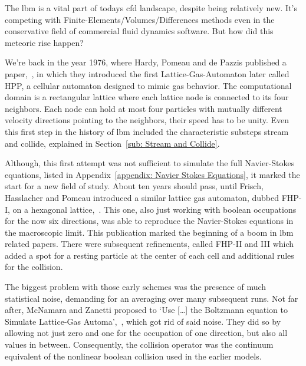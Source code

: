 
The \gls{lbm} is a vital part of todays \gls{cfd} landscape, despite being relatively new.
It's competing with Finite-Elements/Volumes/Differences methods even in the conservative field of commercial fluid dynamics software.
But how did this meteoric rise happen?

We're back in the year 1976, where Hardy, Pomeau and de Pazzis published a paper,~\cite{hardy1976molecular}, in which they introduced the first Lattice-Gas-Automaton later called HPP, a cellular automaton designed to mimic gas behavior.
The computational domain is a rectangular lattice where each lattice node is connected to its four neighbors.
Each node can hold at most four particles with mutually different velocity directions pointing to the neighbors, their speed has to be unity.
Even this first step in the history of \gls{lbm} included the characteristic substeps stream and collide, explained in Section~\ref{sub: Stream and Collide}.

Although, this first attempt was not sufficient to simulate the full Navier-Stokes equations, listed in Appendix~\ref{appendix: Navier Stokes Equations}, it marked the start for a new field of study.
About ten years should pass, until Frisch, Hasslacher and Pomeau introduced a similar lattice gas automaton, dubbed FHP-I, on a hexagonal lattice,~\cite{frisch1986lattice}.
This one, also just working with boolean occupations for the now six directions, was able to reproduce the Navier-Stokes equations in the macroscopic limit.
This publication marked the beginning of a boom in \gls{lbm} related papers.
There were subsequent refinements, called FHP-II and III which added a spot for a resting particle at the center of each cell and additional rules for the collision.

The biggest problem with those early schemes was the presence of much statistical noise, demanding for an averaging over many subsequent runs.
Not far after, McNamara and Zanetti proposed to `Use [\ldots] the Boltzmann equation to Simulate Lattice-Gas Automa',~\cite{PhysRevLett.61.2332}, which got rid of said noise.
They did so by allowing not just zero and one for the occupation of one direction, but also all values in between.
Consequently, the collision operator was the continuum equivalent of the nonlinear boolean collision used in the earlier models.

